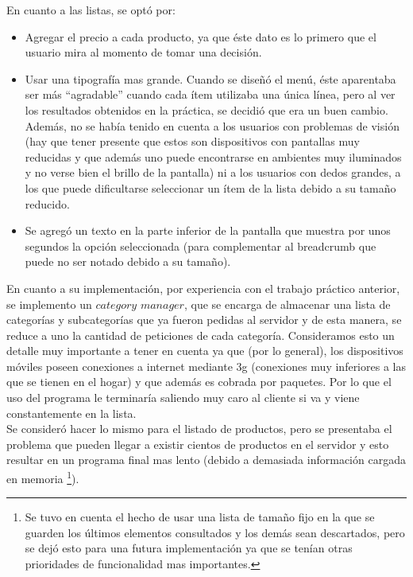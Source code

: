 \documentclass[english]{article}
\begin{document}
En cuanto a las listas, se optó por: 
\begin{itemize}
\item Agregar el precio a cada producto, ya que éste dato es lo primero
que el usuario mira al momento de tomar una decisión. 
\item Usar una tipografía mas grande. Cuando se diseñó el menú, éste aparentaba
ser más {}``agradable” cuando cada ítem utilizaba una única línea,
pero al ver los resultados obtenidos en la práctica, se decidió que
era un buen cambio. Además, no se había tenido en cuenta a los usuarios
con problemas de visión (hay que tener presente que estos son dispositivos
con pantallas muy reducidas y que además uno puede encontrarse en
ambientes muy iluminados y no verse bien el brillo de la pantalla)
ni a los usuarios con dedos grandes, a los que puede dificultarse
seleccionar un ítem de la lista debido a su tamaño reducido. 
\item Se agregó un texto en la parte inferior de la pantalla que muestra
por unos segundos la opción seleccionada (para complementar al breadcrumb
que puede no ser notado debido a su tamaño).\\

\end{itemize}
En cuanto a su implementación, por experiencia con el trabajo práctico
anterior, se implemento un \textquotedbl{}$category$ $manager$\textquotedbl{},
que se encarga de almacenar una lista de categorías y subcategorías
que ya fueron pedidas al servidor y de esta manera, se reduce a uno
la cantidad de peticiones de cada categoría. Consideramos esto un
detalle muy importante a tener en cuenta ya que (por lo general),
los dispositivos móviles poseen conexiones a internet mediante 3g
(conexiones muy inferiores a las que se tienen en el hogar) y que
además es cobrada por paquetes. Por lo que el uso del programa le terminaría
saliendo muy caro al cliente si va y viene constantemente en la lista.\\
 Se consideró hacer lo mismo para el listado de productos, pero
se presentaba el problema que pueden llegar a existir cientos de productos
en el servidor y esto resultar en un programa final mas lento (debido
a demasiada información cargada en memoria%
\footnote{Se tuvo en cuenta el hecho de usar una lista de tamaño fijo en la
que se guarden los últimos elementos consultados y los demás sean
descartados, pero se dejó esto para una futura implementación ya que
se tenían otras prioridades de funcionalidad mas importantes.%
}).\\
 
\end{document}
